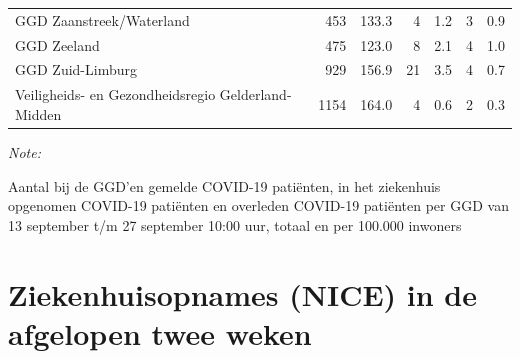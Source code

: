 \documentclass[
  english,
  man,floatsintext]{apa6}
\begin{document}
\begin{table}
\begin{threeparttable}
\begin{tabular}{lrrrrrr}
GGD Zaanstreek/Waterland & 453 & 133.3 & 4 & 1.2 & 3 & 0.9\\
GGD Zeeland & 475 & 123.0 & 8 & 2.1 & 4 & 1.0\\
GGD Zuid-Limburg & 929 & 156.9 & 21 & 3.5 & 4 & 0.7\\
Veiligheids- en Gezondheidsregio Gelderland-Midden & 1154 & 164.0 & 4 & 0.6 & 2 & 0.3\\
\bottomrule
\end{tabular}
\begin{tablenotes}
\item \textit{Note: } 
\item Aantal bij de GGD’en gemelde COVID-19 patiënten, in het ziekenhuis opgenomen COVID-19 patiënten en overleden COVID-19 patiënten per GGD van 13 september t/m 27 september 10:00 uur, totaal en per 100.000 inwoners
\end{tablenotes}
\end{threeparttable}
\endgroup{}
\end{table}

\newpage

\hypertarget{ziekenhuisopnames-nice-in-de-afgelopen-twee-weken}{%
\section{Ziekenhuisopnames (NICE) in de afgelopen twee weken}\label{ziekenhuisopnames-nice-in-de-afgelopen-twee-weken}}
\end{document}
